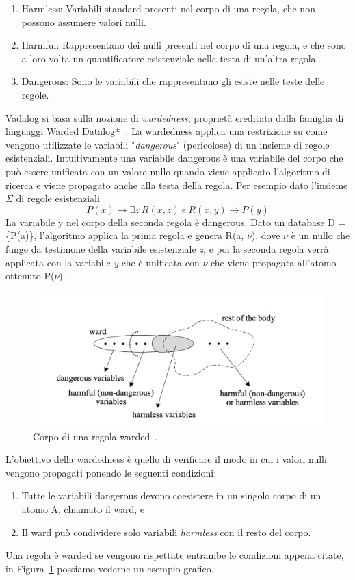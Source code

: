 \begin{enumerate}
	\item Harmless: Variabili standard presenti nel corpo di una regola, che non possono assumere valori nulli.
	\item Harmful: Rappresentano dei nulli presenti nel corpo di una regola, e che sono a loro volta un quantificatore esistenziale nella testa di un'altra regola.
	\item Dangerous: Sono le variabili che rappresentano gli esiste nelle teste delle regole.
\end{enumerate}

Vadalog si basa sulla nozione di \emph{wardedness}, proprietà ereditata dalla famiglia di linguaggi Warded Datalog$^\pm$~\cite{gottlob2015beyond}. \newline
La wardedness applica una restrizione su come vengono utilizzate le variabili "\textit{dangerous}" (pericolose) di un insieme di regole esistenziali. Intuitivamente una variabile dangerous è una variabile del corpo che può essere unificata con un valore nullo quando viene applicato l'algoritmo di ricerca e viene propagato anche alla testa della regola.\newline
Per esempio dato l'insieme $\Sigma$ di regole esistenziali \[P(x) \rightarrow \exists z~R(x,z)~e~R(x,y) \rightarrow P(y)\]
La variabile y nel corpo della seconda regola è dangerous. Dato un database D = \{P(a)\}, l'algoritmo applica la prima regola e genera R(a, $\nu$), dove $\nu$ è un nullo che funge da testimone della variabile esistenziale \textit{z}, e poi la seconda regola verrà applicata con la variabile \textit{y} che è unificata con $\nu$ che viene propagata all'atomo ottenuto P($\nu$). \newline

\begin{figure}[h!]
	\centering
	\includegraphics[width=0.8\linewidth]{figure/wardedness}
	\caption{Corpo di una regola warded~\cite{gottlob2015beyond}.}
	\label{fig:wardedness}
\end{figure}
L'obiettivo della wardedness è quello di verificare il modo in cui i valori nulli vengono propagati ponendo le seguenti condizioni: 
\begin{enumerate}
	\item  Tutte le variabili dangerous devono coesistere in un singolo corpo di un atomo A, chiamato il ward, e 
	\item Il ward può condividere solo variabili \textit{harmless} con il resto del corpo.
\end{enumerate}
Una regola è warded se vengono rispettate entrambe le condizioni appena citate, in Figura~\ref{fig:wardedness} possiamo vederne un esempio grafico. \newline


